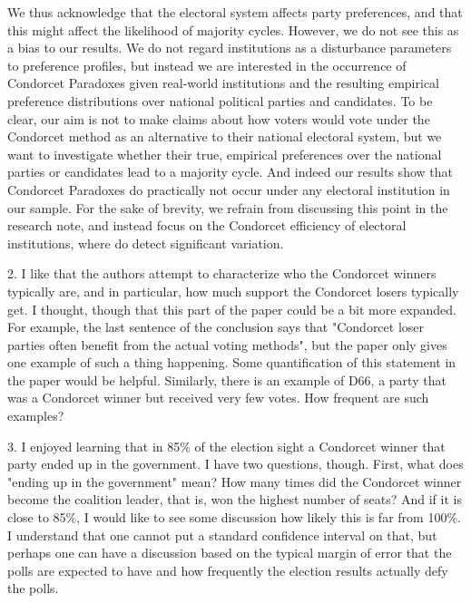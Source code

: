 \documentclass[a4paper, 12pt]{scrartcl}
\theoremstyle{break}
\newenvironment{changes}{\par\color{violet}\par\addvspace{\baselineskip}}{\par\addvspace{\baselineskip}}
\begin{document}
We thus acknowledge that the electoral system affects party preferences, and that this might affect the likelihood of majority cycles. However, we do not see this as a bias to our results. We do not regard institutions as a disturbance parameters to  preference profiles, but  instead we are interested in the occurrence of Condorcet Paradoxes given real-world institutions and the resulting empirical preference distributions over national political parties and candidates. To be clear, our aim is not to make claims about how voters would vote under the Condorcet method as an alternative to their national electoral system, but we want to investigate whether their true, empirical preferences over the national parties or candidates lead to a majority cycle. And indeed our results show that Condorcet Paradoxes do practically not occur under any electoral institution in our sample. For the sake of brevity, we refrain from discussing this point in the research note, and instead focus on the Condorcet efficiency of electoral institutions, where do detect significant variation.

\begin{changes}
2. I like that the authors attempt to characterize who the Condorcet winners typically are, and in particular, how much support the Condorcet losers typically get. I thought, though that this part of the paper could be a bit more expanded. For example, the last sentence of the conclusion says that "Condorcet loser parties often benefit from the actual voting methods", but the paper only gives one example of such a thing happening. Some quantification of this statement in the paper would be helpful. Similarly, there is an example of D66, a party that was a Condorcet winner but received very few votes. How frequent are such examples?
\end{changes}

\begin{changes}
3. I enjoyed learning that in 85\% of the election sight a Condorcet winner that party ended up in the government. I have two questions, though. First, what does "ending up in the government" mean? How many times did the Condorcet winner become the coalition leader, that is, won the highest number of seats? And if it is close to 85\%, I would like to see some discussion how likely this is far from 100\%. I understand that one cannot put a standard confidence interval on that, but perhaps one can have a discussion based on the typical margin of error that the polls are expected to have and how frequently the election results actually defy the polls. 
\end{changes}
\end{document}
